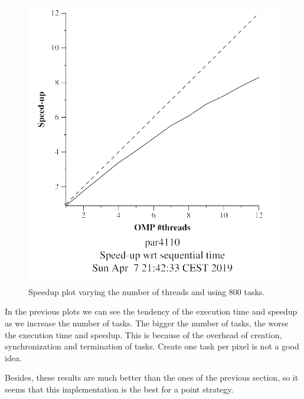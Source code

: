 \documentclass[12pt, a4paper]{article}
\begin{document}
\begin{figure}[H]
\begin{minipage}[t]{0.48\linewidth}
  \includegraphics[scale=0.5]{./mandel-omp-10000-strong-omp-24-800-speedup}
  \caption{Speedup plot varying the number of threads and using 800 tasks.}
  \label{fig:mandel-omp-10000-strong-omp-24-800-speedup}
\end{minipage}
\end{figure}

In the previous plots we can see the tendency of the execution time and speedup as we increase the number of tasks. The bigger the number of tasks, the worse the execution time and speedup. This is because of the overhead of creation, synchronization and termination of tasks. Create one task per pixel is not a good idea.

Besides, these results are much better than the ones of the previous section, so it seems that this implementation is the best for a point strategy.
\end{document}

